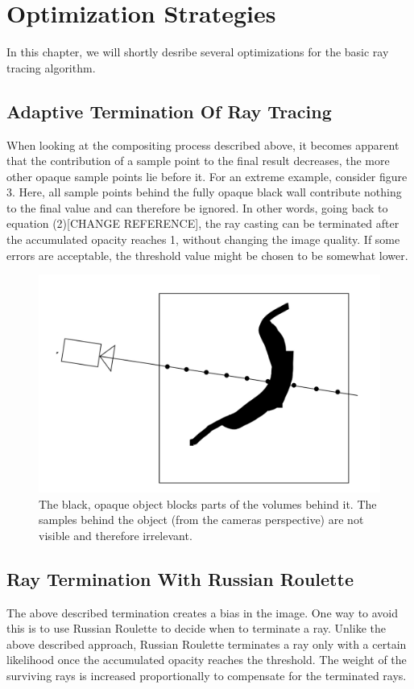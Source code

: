 {\section{Optimization Strategies}
In this chapter, we will shortly desribe several optimizations for the basic ray tracing algorithm.
\subsection{Adaptive Termination Of Ray Tracing}
When looking at the compositing process described above, it becomes apparent that the contribution of a sample point to the final result decreases, the more other opaque sample points lie before it\cite{10.1145/78964.78965}. For an extreme example, consider figure 3. Here, all sample points behind the fully opaque black wall contribute nothing to the final value and can therefore be ignored. In other words, going back to equation (2)[CHANGE REFERENCE], the ray casting can be terminated after the accumulated opacity reaches 1, without changing the image quality. If some errors are acceptable, the threshold value might be chosen to be somewhat lower.
 \begin{figure}[htb]
  \centering
  \includegraphics[width=.8\linewidth]{wall.png}
  \parbox[t]{.9\columnwidth}{\relax}
  \caption{\label{fig:firstExample}
         The black, opaque object blocks parts of the volumes behind it. The samples behind the object (from the cameras perspective) are not visible and therefore irrelevant. }
\end{figure}
\subsection{Ray Termination With Russian Roulette}
The above described termination creates a bias in the image\cite{10.1145/97880.97886}. One way to avoid this is to use Russian Roulette to decide when to terminate a ray\cite{10.1145/147130.147155}. Unlike the above described approach, Russian Roulette terminates a ray only with a certain likelihood once the accumulated opacity reaches the threshold. The weight of the surviving rays is increased proportionally to compensate for the terminated rays.

}
